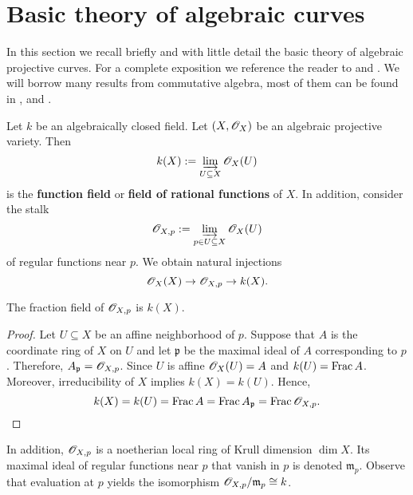 \section{Basic theory of algebraic curves}
In this section we recall briefly and with little detail the basic theory of algebraic projective curves. For a complete exposition we reference the reader to \cite{curves} and \cite{hartshorne}. We will borrow many results from commutative algebra, most of them can be found in \cite{Matsumura}, \cite{comm-alg} and \cite{atiyah}.

Let $k$ be an algebraically closed field. Let $(X, {\mathscr O}_{X})$ be an algebraic projective variety. Then 
\[
	k(X) := \varinjlim_{U\subseteq X} {\mathscr O}_{X}(U)
\]
 is the \textbf{function field} or \textbf{field of rational functions} of $X$. In addition, consider the stalk 
\[
	{\mathscr O}_{X,p} := \varinjlim_{p\in U\subseteq X} {\mathscr O}_{X}(U)
\]
of regular functions near $p$. We obtain natural injections 
\[
 	{\mathscr O}_{X}(X) \to {\mathscr O}_{X,p} \to k(X).
\] 
\begin{proposition}\label{prop:fraction-field-local-function-field}
	The fraction field of ${\mathscr O}_{X,p}$ is $k(X)$.
\end{proposition}
\begin{proof}
	Let $U \subseteq X$ be an affine neighborhood of $p$. Suppose that $A$ is the coordinate ring of $X$ on $U$ and let $\mathfrak{p}$ be the maximal ideal of $A$ corresponding to $p$. Therefore, $A_{\mathfrak{p}} = {\mathscr O}_{X,p}$. Since $U$ is affine ${\mathscr O}_{X}(U) = A$ and $k(U) = \operatorname{Frac}{A}$. Moreover, irreducibility of $X$ implies $k(X) = k(U)$. Hence, 
	\[
		k(X) = k(U) = \operatorname{Frac}{A} = \operatorname{Frac}{A_{\mathfrak{p}}} = \operatorname{Frac}{{\mathscr O}_{X,p}}.
	\]
\end{proof}

In addition, ${\mathscr O}_{X,p}$ is a noetherian local ring of Krull dimension $\dim X$.
Its maximal ideal of regular functions near $p$ that vanish in $p$ is denoted $\mathfrak{m}_{p}$. Observe that evaluation at $p$ yields the isomorphism ${\mathscr O}_{X,p}/\mathfrak{m}_{p} \cong k$.

